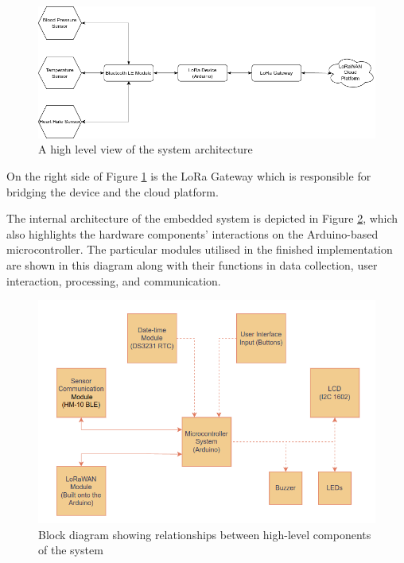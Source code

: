 \begin{figure}[H]
\centering
\includegraphics[width=\textwidth]{diagrams/high_level_architecture}
\caption{A high level view of the system architecture}
\label{fig:high_level_architecture_diagram}
\end{figure}

On the right side of Figure \ref{fig:high_level_architecture_diagram} is the LoRa Gateway which is responsible for bridging the device and the cloud platform.

The internal architecture of the embedded system is depicted in Figure \ref{fig:block_diagram}, which also highlights the hardware components' interactions on the Arduino-based microcontroller. The particular modules utilised in the finished implementation are shown in this diagram along with their functions in data collection, user interaction, processing, and communication.

\begin{figure}[H]
\centering
\includegraphics[width=\textwidth]{diagrams/block_diagram}
\caption{Block diagram showing relationships between high-level components of the system}
\label{fig:block_diagram}
\end{figure}

